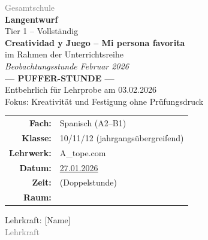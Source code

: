 \documentclass[11pt,a4paper]{article}
\newcommand{\fach}{Spanisch}
\newcommand{\jahrgangsstufe}{10/11/12 (jahrgangsübergreifend)}
\newcommand{\schulart}{Gesamtschule}
\newcommand{\stundenthema}{Creatividad y Juego -- Mi persona favorita}
\newcommand{\reihenthema}{Beobachtungsstunde Februar 2026}
\newcommand{\unterrichtsdatum}{27.01.2026}
\newcommand{\lehrkraft}{[Name]}
\newcommand{\ausbildungsstand}{Lehrkraft}
\newcommand{\gerniveau}{A2--B1}
\newcommand{\lehrwerk}{A\_tope.com}
\begin{document}
\begin{titlepage}
    \centering
    \vspace*{2cm}

    {\large\textcolor{gray}{\schulart}}\\[2cm]

    {\Huge\textcolor{fach}{\textbf{Langentwurf}}}\\[0.5cm]
    {\large Tier 1 -- Vollständig}\\[2cm]

    {\LARGE\textbf{\stundenthema}}\\[0.5cm]
    {\large im Rahmen der Unterrichtsreihe}\\[0.3cm]
    {\Large\textit{\reihenthema}}\\[1cm]

    \textcolor{puffer}{\Large\textbf{--- PUFFER-STUNDE ---}}\\[0.3cm]
    {\normalsize Entbehrlich für Lehrprobe am 03.02.2026}\\[0.3cm]
    {\normalsize Fokus: Kreativität und Festigung ohne Prüfungsdruck}\\[1.5cm]

    \begin{tabular}{rl}
        \textbf{Fach:} & \fach{} (\gerniveau) \\[0.3cm]
        \textbf{Klasse:} & \jahrgangsstufe \\[0.3cm]
        \textbf{Lehrwerk:} & \lehrwerk \\[0.3cm]
        \textbf{Datum:} & \underline{\hspace{1cm}\unterrichtsdatum\hspace{1cm}} \\[0.3cm]
        \textbf{Zeit:} & \underline{\hspace{3cm}} (Doppelstunde) \\[0.3cm]
        \textbf{Raum:} & \underline{\hspace{3cm}} \\[0.3cm]
    \end{tabular}

    \vfill

    {\large Lehrkraft: \lehrkraft}\\[0.3cm]
    {\normalsize\textcolor{gray}{\ausbildungsstand}}\\[1cm]

\end{titlepage}
\end{document}
